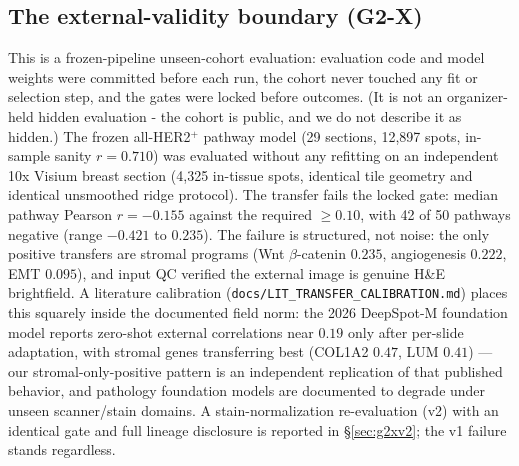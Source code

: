 \documentclass[11pt]{article}
\begin{document}
\subsection{The external-validity boundary (G2-X)}
\label{sec:g2x}
This is a frozen-pipeline unseen-cohort evaluation: evaluation code and model
weights were committed before each run, the cohort never touched any fit or
selection step, and the gates were locked before outcomes. (It is not an
organizer-held hidden evaluation - the cohort is public, and we do not
describe it as hidden.) The frozen all-HER2$^+$ pathway model (29 sections,
12{,}897 spots, in-sample
sanity $r=0.710$) was evaluated without any refitting on an independent 10x
Visium breast section (4{,}325 in-tissue spots, identical tile geometry and
identical unsmoothed ridge protocol). The transfer fails the locked gate:
median pathway Pearson $r=-0.155$ against the required $\ge 0.10$, with 42 of
50 pathways negative (range $-0.421$ to $0.235$). The failure is structured,
not noise: the only positive transfers are stromal programs (Wnt $\beta$-catenin
$0.235$, angiogenesis $0.222$, EMT $0.095$), and input QC verified the external
image is genuine H\&E brightfield. A literature calibration
(\texttt{docs/LIT\_TRANSFER\_CALIBRATION.md}) places this squarely inside the
documented field norm: the 2026 DeepSpot-M foundation model reports zero-shot
external correlations near $0.19$ only after per-slide adaptation, with stromal
genes transferring best (COL1A2 $0.47$, LUM $0.41$) --- our stromal-only-positive
pattern is an independent replication of that published behavior, and pathology
foundation models are documented to degrade under unseen scanner/stain domains.
A stain-normalization re-evaluation (v2) with an identical gate and full lineage
disclosure is reported in \S\ref{sec:g2xv2}; the v1 failure stands regardless.
\end{document}
